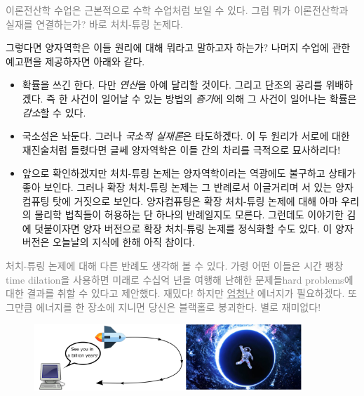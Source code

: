 \documentclass[a4paper,chapter,atbegshi,]{oblivoir}
\begin{document}
\hfill

\hfill\parbox[t]{9cm}{\textcolor{gray}{이론전산학 수업은 근본적으로 수학 수업처럼
보일 수 있다. 그럼 뭐가 이론전산학과 실재를 연결하는가? 바로 처치-튜링 논제다.}}

\hfill\break

그렇다면 양자역학은 이들 원리에 대해 뭐라고 말하고자 하는가? 나머지 수업에 관한
예고편을 제공하자면 아래와 같다.

\hfill

\begin{itemize}[label=$\blacktriangleright$]
    \item 확률을 쓰긴 한다. 다만 \emph{연산}을 아예
        달리할 것이다. 그리고 단조의 공리를 위배하겠다. 즉 한 사건이
        일어날 수 있는 방법의 \emph{증가}에 의해 그 사건이 일어나는 확률은
        \emph{감소}할 수 있다.
    \item 국소성은 놔둔다. 그러나 \emph{국소적 실재론}은 타도하겠다. 이 두
        원리가 서로에 대한 재진술처럼 들렸다면 글쎄 양자역학은 이들 간의 차리를
        극적으로 묘사하리다!
    \item 앞으로 확인하겠지만 처치-튜링 논제는 양자역학이라는 역광에도 불구하고
        상태가 좋아 보인다. 그러나 확장 처치-튜링 논제는 그 반례로서 이글거리며
        서 있는 양자컴퓨팅 탓에 거짓으로 보인다. 양자컴퓨팅은 확장 처치-튜링 
        논제에 대해 아마 우리의 물리학 법칙들이 허용하는 단 하나의 반례일지도
        모른다. 그런데도 이야기한 김에 덧붙이자면 양자 버전으로 확장 처치-튜링
        논제를 정식화할 수도 있다. 이 양자 버전은 오늘날의 지식에 한해 아직 
        참이다.
\end{itemize}

\hfill\break

\hfill\parbox[t]{9cm}{\textcolor{gray}{ 처치-튜링 논제에 대해 다른
반례도 생각해 볼 수 있다. 가령 어떤 이들은 시간 팽창{\footnotesize time 
dilation}을 사용하면 미래로 수십억 년을 여행해 난해한 문제들{\footnotesize hard
problems}에 대한 결과를 취할 수 있다고 제안했다. 재밌다! 하지만 \underline{엄청난}
에너지가 필요하겠다. 또 그만큼 에너지를 한 장소에 지니면 당신은 블랙홀로
붕괴한다. 별로 재미없다!}}

\hfill\break

\begin{figure}[h]
    \centering
    \includegraphics[width=0.9\textwidth]{iqis1_003}
\end{figure}
\end{document}

